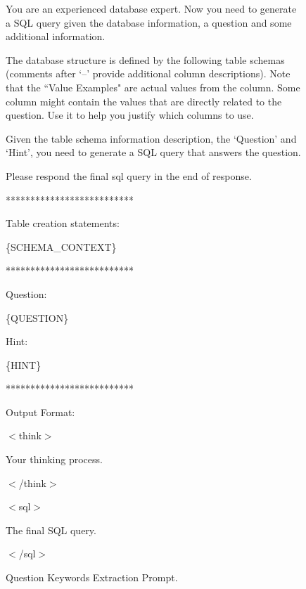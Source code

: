 \begin{figure}[h!]
    \centering
    \begin{tcolorbox}[
        title=Baseline Text-to-SQL Prompt,
        colback=white,        %
        colframe=blue!75!black,  %
        fonttitle=\bfseries,    %
    ]

You are an experienced database expert.
Now you need to generate a SQL query given the database information, a question and some additional information.

\vspace{1em}
The database structure is defined by the following table schemas (comments after `--' provide additional column descriptions).
Note that the ``Value Examples" are actual values from the column. Some column might contain the values that are directly related to the question. Use it to help you justify which columns to use.

\vspace{1em}
Given the table schema information description, the `Question' and `Hint', you need to generate a SQL query that answers the question.

Please respond the final sql query in the end of response.

**************************

Table creation statements:

\{SCHEMA\_CONTEXT\}

**************************

Question: 

\{QUESTION\}

Hint:

\{HINT\}

**************************

Output Format:

$<$think$>$

Your thinking process.

$<$/think$>$

$<$sql$>$

The final SQL query.

$<$/sql$>$

    \end{tcolorbox}
    \caption{Question Keywords Extraction Prompt.}
    \label{fig:prompt-keyword-extraction}
\end{figure}